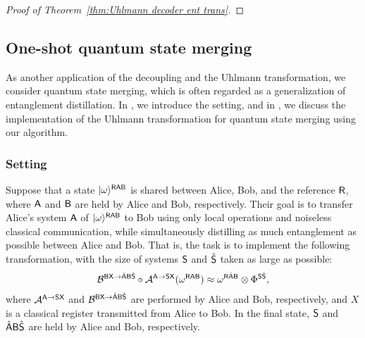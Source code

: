 \begin{proof}[Proof of Theorem~\ref{thm:Uhlmann decoder ent trans}]
\end{proof}












\subsection{One-shot quantum state merging}
\label{sec:entdis and uhl}

As another application of the decoupling and the Uhlmann transformation, we consider quantum state merging, which is often regarded as a generalization of entanglement distillation.
In , we introduce the setting, and in , we discuss the implementation of the Uhlmann transformation for quantum state merging using our algorithm.


\subsubsection{Setting}
\label{sec:setting of state merging}


Suppose that a state $|\omega\rangle^{{\mathsf{R}}{\mathsf{A}}{\mathsf{B}}}$ is shared between Alice, Bob, and the reference ${\mathsf{R}}$, where ${\mathsf{A}}$ and ${\mathsf{B}}$ are held by Alice and Bob, respectively.
Their goal is to transfer Alice's system ${\mathsf{A}}$ of $|\omega\rangle^{{\mathsf{R}}{\mathsf{A}}{\mathsf{B}}}$ to Bob using only local operations and noiseless classical communication, while simultaneously distilling as much entanglement as possible between Alice and Bob.
That is, the task is to implement the following transformation, with the size of systems ${\mathsf{S}}$ and $\hat{{\mathsf{S}}}$ taken as large as possible:
\begin{align}
    {\mathcal{B}}^{{\mathsf{B}}{\mathsf{X}}\rightarrow\hat{{\mathsf{A}}}{\mathsf{B}}\hat{{\mathsf{S}}}}\circ{\mathcal{A}}^{{\mathsf{A}}\rightarrow{\mathsf{S}}{\mathsf{X}}}(\omega^{{\mathsf{R}}{\mathsf{A}}{\mathsf{B}}}) \approx \omega^{{\mathsf{R}}\hat{{\mathsf{A}}}{\mathsf{B}}} \otimes \Phi^{{\mathsf{S}}\hat{{\mathsf{S}}}},    
\end{align}
where ${\mathcal{A}}^{{\mathsf{A}}\rightarrow{\mathsf{S}}{\mathsf{X}}}$ and ${\mathcal{B}}^{{\mathsf{B}}{\mathsf{X}}\rightarrow\hat{{\mathsf{A}}}{\mathsf{B}}\hat{{\mathsf{S}}}}$ are performed by Alice and Bob, respectively, and $X$ is a classical register transmitted from Alice to Bob.
In the final state, ${\mathsf{S}}$ and $\hat{{\mathsf{A}}}{\mathsf{B}}\hat{{\mathsf{S}}}$ are held by Alice and Bob, respectively.



